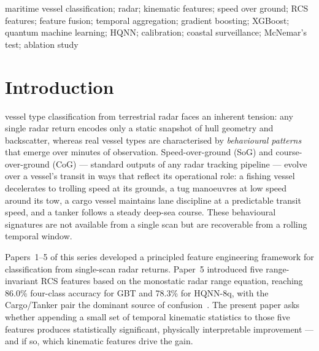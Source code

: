 \documentclass[journal]{IEEEtran}
\begin{document}
{\begin{abstract}
max $|\bar{r}| = 0.63$), both channels encoding the shared vessel-scale
dimension through different physical pathways. Cargo-to-Tanker confusion
falls from 18.0\% to 10.7\% after fusion. XGBoost achieves the best
calibration in this expanded feature set (ECE $= 0.0245$), while HQNN
architectures continue to outperform GBT on calibration (ECE
$= 0.0236$ for HQNN-8q on RCS features).
\end{abstract}
\begin{IEEEkeywords}
maritime vessel classification; radar; kinematic features; speed over
ground; RCS features; feature fusion; temporal aggregation; gradient
boosting; XGBoost; quantum machine learning; HQNN; calibration;
coastal surveillance; McNemar's test; ablation study
\end{IEEEkeywords}}

\maketitle
\IEEEdisplaynontitleabstractindextext
\IEEEpeerreviewmaketitle

\section{Introduction}
\label{sec:intro}

 vessel type classification from terrestrial
radar faces an inherent tension: any single radar return encodes only a
static snapshot of hull geometry and backscatter, whereas real vessel
types are characterised by \emph{behavioural patterns} that emerge over
minutes of observation. Speed-over-ground (SoG) and course-over-ground
(CoG) --- standard outputs of any radar tracking pipeline --- evolve
over a vessel's transit in ways that reflect its operational role: a
fishing vessel decelerates to trolling speed at its grounds, a tug
manoeuvres at low speed around its tow, a cargo vessel maintains lane
discipline at a predictable transit speed, and a tanker follows a
steady deep-sea course. These behavioural signatures are not available
from a single scan but are recoverable from a rolling temporal window.

Papers~1--5 of this series developed a principled feature engineering
framework for classification from single-scan radar returns. Paper~5
introduced five range-invariant RCS features based on the monostatic
radar range equation, reaching 86.0\% four-class accuracy for GBT and
78.3\% for HQNN-8q, with the Cargo/Tanker pair the dominant source of
confusion~\cite{paper5rcs}. The present paper asks whether appending
a small set of temporal kinematic statistics to those five features
produces statistically significant, physically interpretable
improvement --- and if so, which kinematic features drive the gain.
\end{document}
